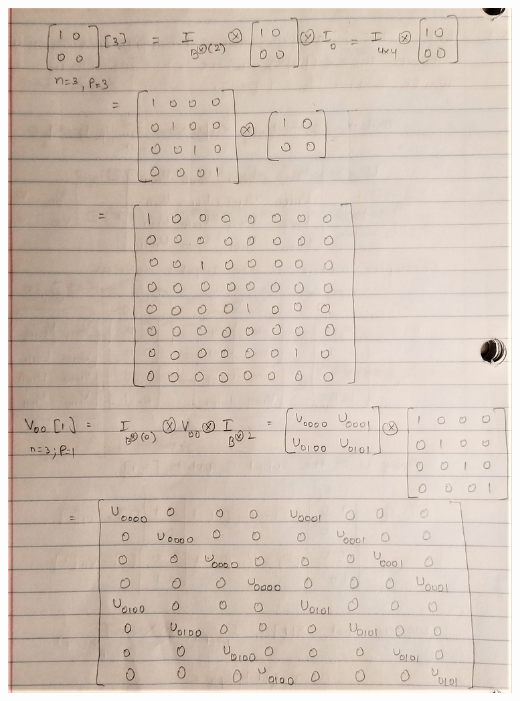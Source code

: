 \documentclass [12pt]{article}
\theoremstyle{definition}
\begin{document}
\includegraphics[width=18cm, height=23cm]{I22}\\
\end{document}
